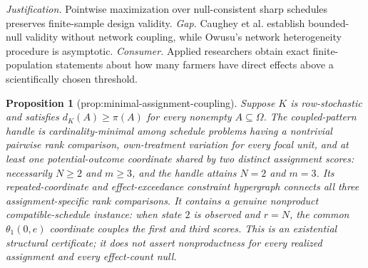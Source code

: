 \documentclass{article}
\newtheorem{proposition}{Proposition}
\begin{document}
\par\smallskip\noindent \textit{Justification.} Pointwise maximization over null-consistent sharp schedules preserves finite-sample design validity. \textit{Gap.} Caughey et al. establish bounded-null validity without network coupling, while Owusu's network heterogeneity procedure is asymptotic. \textit{Consumer.} Applied researchers obtain exact finite-population statements about how many farmers have direct effects above a scientifically chosen threshold.

\begin{proposition}[prop:minimal-assignment-coupling]\label{prop:minimal-assignment-coupling}
Suppose \(K\) is row-stochastic and satisfies \(d_K(A)\geq\pi(A)\) for every
nonempty \(A\subseteq\Omega\).  The coupled-pattern handle is cardinality-minimal
among schedule problems having a nontrivial pairwise rank comparison,
own-treatment variation for every focal unit, and at least one potential-outcome
coordinate shared by two distinct assignment scores: necessarily \(N\geq2\) and
\(m\geq3\), and the handle attains \(N=2\) and \(m=3\).  Its repeated-coordinate
and effect-exceedance constraint hypergraph connects all three assignment-specific
rank comparisons.  It contains a genuine nonproduct compatible-schedule instance:
when state \(2\) is observed and \(r=N\), the common
\(\theta_1(0,e)\) coordinate couples the first and third scores.  This is an
existential structural certificate; it does not assert nonproductness for every
realized assignment and every effect-count null.
\end{proposition}
\end{document}
